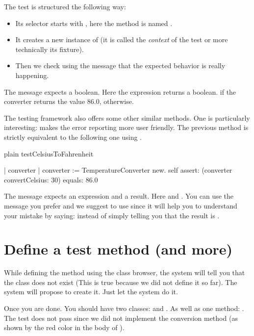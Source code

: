 \documentclass[10pt,twoside,english]{_support/latex/sbabook/sbabook}
\begin{document}
The test is structured the following way:

\begin{itemize}
\item Its selector starts with , here the method is named .
\item It creates a new instance of  (it is called the \textit{context} of the test or more technically its fixture).
\item Then we check using the message  that the expected behavior is really happening. 
\end{itemize}

The message  expects a boolean. Here the expression  returns a boolean.  if the converter returns the value 86.0,  otherwise. 

The testing framework also offers some other similar methods. One is particularly interesting:  makes the error reporting more user friendly. The previous method is strictly equivalent to the following one using . 

\begin{displaycode}{plain}
testCelsiusToFahrenheit

	| converter |
	converter := TemperatureConverter new. 
	self assert: (converter convertCelsius: 30) equals: 86.0
\end{displaycode}

The message  expects an expression and a result. Here  and . You can use the message you prefer and we suggest to use  since it will help you to understand your mistake by saying:  instead of simply telling you that the result is . 
\section{Define a test method (and more)}
While defining the method  using the class browser, the system will tell you that the class  does not exist (This is true because we did not define it so far). The system will propose to create it. Just let the system do it. 

Once you are done. You should have two classes:  and . As well as one method: . The test does not pass since we did not implement the conversion method (as shown by the red color in the body of ).
\end{document}
